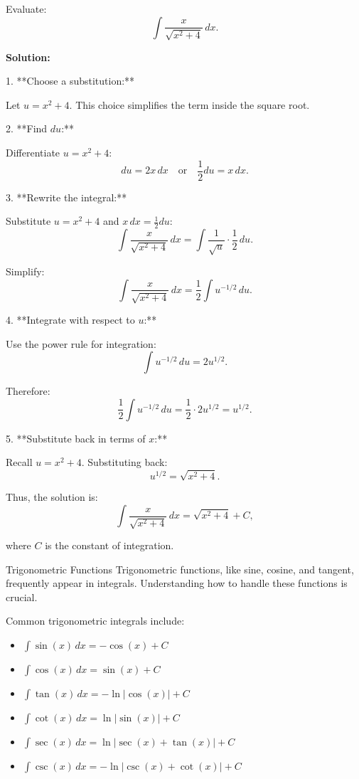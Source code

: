 \documentclass[12pt]{article}
\theoremstyle{beautifulthm}
\begin{document}
\begin{tcolorbox}[colback=examplebg, colframe=red!75!black, title=\textbf{EXAMPLE 2: Find the Integral of the Function}, fonttitle=\bfseries, sharp corners]

Evaluate:
\[
\int \frac{x}{\sqrt{x^2 + 4}} \, dx.
\]

\tcblower
\textbf{Solution:} 

1. **Choose a substitution:**

   Let \( u = x^2 + 4 \). This choice simplifies the term inside the square root.

2. **Find \( du \):**

   Differentiate \( u = x^2 + 4 \):
   \[
   du = 2x \, dx \quad \text{or} \quad \frac{1}{2} du = x \, dx.
   \]

3. **Rewrite the integral:**

   Substitute \( u = x^2 + 4 \) and \( x \, dx = \frac{1}{2} du \):
   \[
   \int \frac{x}{\sqrt{x^2 + 4}} \, dx = \int \frac{1}{\sqrt{u}} \cdot \frac{1}{2} \, du.
   \]

   Simplify:
   \[
   \int \frac{x}{\sqrt{x^2 + 4}} \, dx = \frac{1}{2} \int u^{-1/2} \, du.
   \]

4. **Integrate with respect to \( u \):**

   Use the power rule for integration:
   \[
   \int u^{-1/2} \, du = 2u^{1/2}.
   \]

   Therefore:
   \[
   \frac{1}{2} \int u^{-1/2} \, du = \frac{1}{2} \cdot 2u^{1/2} = u^{1/2}.
   \]

5. **Substitute back in terms of \( x \):**

   Recall \( u = x^2 + 4 \). Substituting back:
   \[
   u^{1/2} = \sqrt{x^2 + 4}.
   \]

   Thus, the solution is:
   \[
   \int \frac{x}{\sqrt{x^2 + 4}} \, dx = \sqrt{x^2 + 4} + C,
   \]

   where \( C \) is the constant of integration.

\end{tcolorbox}


\newpage
\begin{mytheorem}{Trigonometric Functions}{}
    Trigonometric functions, like sine, cosine, and tangent, frequently appear in integrals. Understanding how to handle these functions is crucial. 

Common trigonometric integrals include:
\begin{itemize}
    \item \(\int \sin(x) \, dx = -\cos(x) + C\)
    \item \(\int \cos(x) \, dx = \sin(x) + C\)
    \item \(\int \tan(x) \, dx = -\ln|\cos(x)| + C\)
    \item \(\int \cot(x) \, dx = \ln|\sin(x)| + C\)
    \item \(\int \sec(x) \, dx = \ln|\sec(x) + \tan(x)| + C\)
    \item \(\int \csc(x) \, dx = -\ln|\csc(x) + \cot(x)| + C\)
\end{itemize}
\end{mytheorem}
\end{document}
